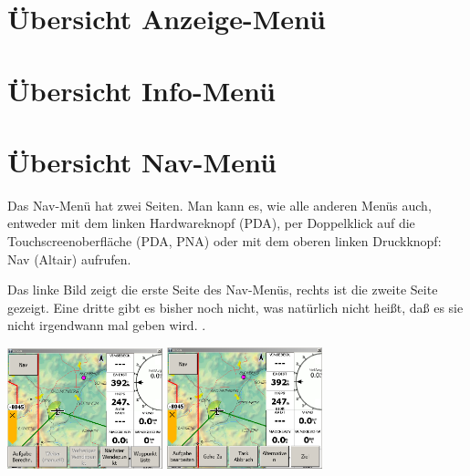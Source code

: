 \section{Übersicht Anzeige-Menü}\label{Blitz-Anzeige}
\section{Übersicht Info-Menü}\label{Blitz-Anzeige}
\section{Übersicht Nav-Menü}\label{Blitz-Nav}
Das \textsf{Nav}-Menü  hat zwei Seiten. Man kann es, wie alle anderen Menüs auch, entweder mit dem linken Hardwareknopf (\textsf{PDA}), per Doppelklick auf die Touchscreenoberfläche  (\textsf{\textsf{PDA, PNA}}) oder mit dem oberen linken Druckknopf: \textsf{Nav} (\textsf{Altair}) aufrufen.

Das linke Bild zeigt die erste Seite des \textsf{Nav}-Menüs, rechts ist die zweite Seite gezeigt. Eine dritte gibt es bisher noch nicht, was natürlich nicht heißt, daß es sie nicht irgendwann mal geben wird. .
\begin{center}
\includegraphics[width=4.5cm]{Bilder/Nav-Menu1.png}
\qquad
\includegraphics[width=4.5cm]{Bilder/Nav-Menu2.png}
\end{center}

